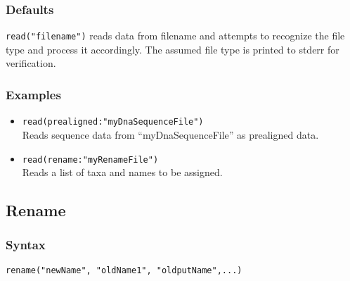 \documentclass[11pt]{article}
\begin{document}
		\subsubsection{Defaults}
			\texttt{read("filename")} reads data from filename and attempts to recognize the file type
			and process it accordingly.  The assumed file type is printed to stderr for verification.
		\subsubsection{Examples}
				\begin{itemize}
					\item{\texttt{read(prealigned:"myDnaSequenceFile")}\\ Reads sequence data from ``myDnaSequenceFile'' as prealigned data.}
					\item{\texttt{read(rename:"myRenameFile")}\\ Reads a list of taxa and names to be assigned.}  
			\end{itemize}
	
	\subsection{Rename}
		\subsubsection{Syntax}
			\texttt{rename("newName", "oldName1", "oldputName",...)}
\end{document}

